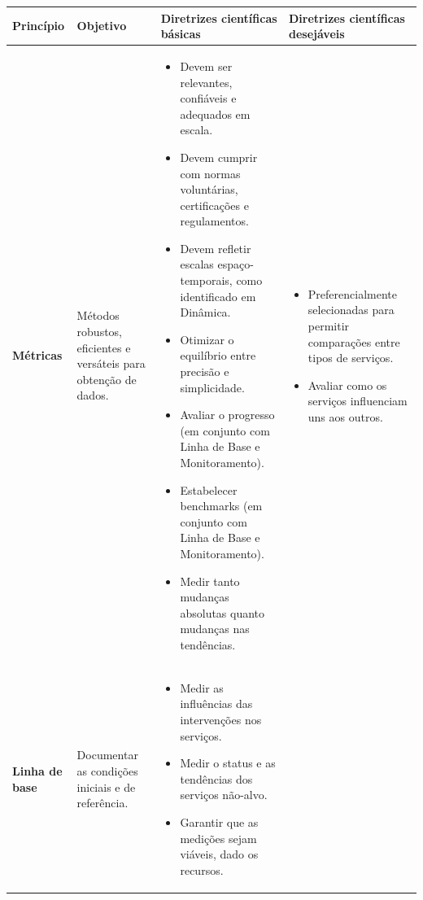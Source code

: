 \documentclass[./main.tex]{subfiles}
\begin{document}
{\renewcommand{\arraystretch}{1.5}
\begin{table}[t!]
    \centering	
    \tiny
    \sffamily
    \begin{tabular}{ 
         >{\raggedright\arraybackslash}m{1.5cm}  
         >{\raggedright\arraybackslash}m{2.2cm}  
         >{\raggedright\arraybackslash}m{4.6cm}
         >{\raggedright\arraybackslash}m{4.6cm}
    }
    \toprule 
\textbf{Princípio} & \textbf{Objetivo} & \textbf{Diretrizes científicas básicas} & \textbf{Diretrizes científicas desejáveis} \\
\midrule
\textbf{Métricas}& 
Métodos robustos, eficientes e versáteis para obtenção de dados.
& \begin{itemize}
    \setlength{\itemsep}{-0.4em}
    \item Devem ser relevantes, confiáveis e adequados em escala.
    \item Devem cumprir com normas voluntárias, certificações e regulamentos.
    \item Devem refletir escalas espaço-temporais, como identificado em Dinâmica.
    \item Otimizar o equilíbrio entre precisão e simplicidade.
    \item Avaliar o progresso (em conjunto com Linha de Base e Monitoramento).
    \item Estabelecer benchmarks (em conjunto com Linha de Base e Monitoramento).
    \item Medir tanto mudanças absolutas quanto mudanças nas tendências. 
\end{itemize}
& \begin{itemize}
    \setlength{\itemsep}{-0.4em}
    \item Preferencialmente selecionadas para permitir comparações entre tipos de serviços.
    \item Avaliar como os serviços influenciam uns aos outros.
\end{itemize} \\
\textbf{Linha de base}
& Documentar as condições iniciais e de referência. 
& \begin{itemize}
    \setlength{\itemsep}{-0.4em}
    \item Medir as influências das intervenções nos serviços.
    \item Medir o status e as tendências dos serviços não-alvo.
    \item Garantir que as medições sejam viáveis, dado os recursos.
\end{itemize}

\end{tabular}
\end{table}}
\end{document}

